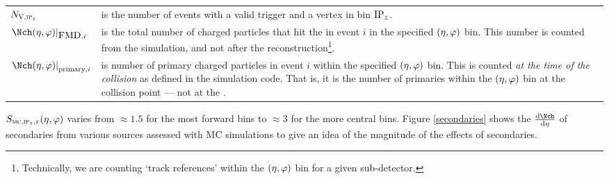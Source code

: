 \documentclass[compat,11pt]{alicenote}
\newcommand*{\etaphi}{\ensuremath(\eta,\varphi)}
\newcommand{\N}[2]{{\ensuremath N_{#1#2}}}
\newcommand{\NV}[1][]{\N{\text{V}}{#1}}
\newcommand*\SecMap{\ensuremath S_{\subMC,\subIPz,r}\etaphi}
\newcommand{\dndetadphi}[1][]{{\ensuremath%
    \ifx|#1|\else\left.\fi%
      \Nch\etaphi%
      \ifx|#1|\else\right|_{#1}\fi}}
\begin{document}
\begin{tabular}[T]{p{.18\linewidth}p{.78\linewidth}}
  $\NV[,\subIPz]$ & is the number of events with a valid trigger
                    and a vertex in bin $\IPz$.\\ 
  $\dndetadphi[\FMD{},i]$ & is the total number of charged
                            particles that hit the \FMD{} in event $i$
                            in the specified $\etaphi$ bin.  This
                            number is counted from the simulation, and
                            not  after the
                            reconstruction\footnote{Technically, we 
                            are counting `track references' within the
                            $\etaphi$ bin for a given
                            sub-detector.}.\\  
  $\dndetadphi[\text{primary},i]$ & is number of primary charged
                                    particles in event $i$ within the
                                    specified $\etaphi$ bin.  This is
                                    counted \emph{at the time of the
                                    collision} as defined in the
                                    simulation code.  That is, it is
                                    the number of primaries within the
                                    $\etaphi$ bin at the collision
                                    point --- not at the \FMD{}. 
\end{tabular}
\iffalse
\begin{description}
\item[] $\NV[,\subIPz]$ is the number of events with a valid trigger
  and a vertex in bin $\IPz$.
\item[] $\dndetadphi[\FMD{},i]$ is the total number of charged
  particles that hit the \FMD{} in event $i$ in the specified
  $\etaphi$ bin.  This number is counted from the simulation, and not
  after the reconstruction\footnote{Technically, we are counting
    `track references' within the $\etaphi$ bin for a given
    sub-detector.}.
\item[] $\dndetadphi[\text{primary},i]$ is number of primary charged
  particles in event $i$ within the specified $\etaphi$ bin.  This is
  counted \emph{at the time of the collision} as defined in the
  simulation code.  That is, it is the number of primaries within the
  $\etaphi$ bin at the collision point --- not at the \FMD{}.
\end{description}
\fi

$\SecMap$ varies from $\approx 1.5$ for the most forward bins to
$\approx 3$ for the more central bins. Figure \ref{secondaries} shows
the $\dndeta$ of secondaries from various sources assessed with MC
simulations to give an idea of the magnitude of the effects of
secondaries.
\end{document}
